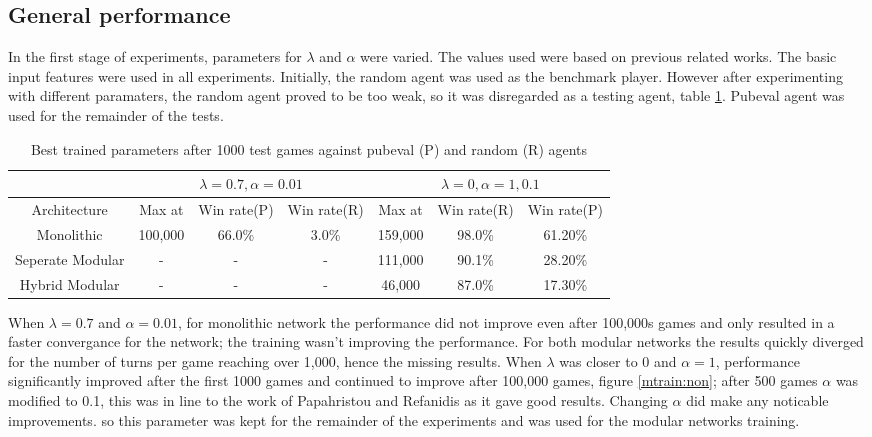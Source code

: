 \documentclass[12pt,a4paper]{article}
\begin{document}
\subsection{General performance}
In the first stage of experiments, parameters for $\lambda$ and $\alpha$ were varied. The values used were based on previous related works. The basic input features were used in all experiments. Initially, the random agent was used as the benchmark player. However after experimenting with different paramaters, the random agent proved to be too weak, so it was disregarded as a testing agent, table \ref{rp}. Pubeval agent was used for the remainder of the tests.
\begin{table}[htb]
    \centering
    \caption{Best trained parameters after 1000 test games against pubeval (P) and random (R) agents}
    \label{rp}
    \begin{tabular}{c|ccc|ccc}
        & \multicolumn{3}{c}{$\lambda=0.7, \alpha=0.01$} & \multicolumn{3}{|c}{$\lambda=0, \alpha=1, 0.1$} \\
        \hline
        \hline
        Architecture & Max at & Win rate(P) & Win rate(R) & Max at & Win rate(R) & Win rate(P)  \\ 
        \hline
        Monolithic & 100,000 & 66.0\% & 3.0\% & 159,000 & 98.0\% & 61.20\% \\ 
        \hline
        Seperate Modular & - & - & - & 111,000 & 90.1\% & 28.20\% \\ 
        \hline
        Hybrid Modular & - & - & - & 46,000 & 87.0\% & 17.30\% \\ 
        \hline
    \end{tabular}
\end{table}

When $\lambda=0.7$ and $\alpha=0.01$, for monolithic network the performance did not improve even after 100,000s games and only resulted in a faster convergance for the network; the training wasn't improving the performance. For both modular networks the results quickly diverged for the number of turns per game reaching over 1,000, hence the missing results. When $\lambda$ was closer to 0 and $\alpha=1$, performance significantly improved after the first 1000 games and continued to improve after 100,000 games, figure \ref{mtrain:non}; after 500 games $\alpha$ was modified to 0.1, this was in line to the work of Papahristou and Refanidis \citeyear{DBLP:conf/ifip12/PapahristouR12} as it gave good results. Changing $\alpha$ did make any noticable improvements. so this parameter was kept for the remainder of the experiments and was used for the modular networks training.
\end{document}
